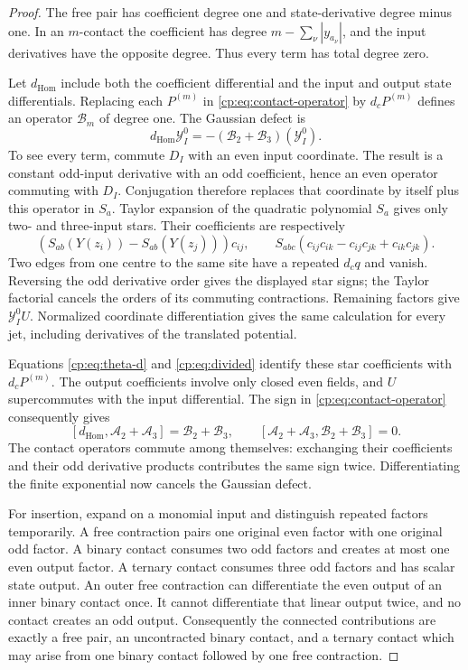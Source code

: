 \begin{proof}
The free pair has coefficient degree one and state-derivative degree
minus one.  In an \(m\)-contact the coefficient has degree
\(m-\sum_\nu|y_{a_\nu}|\), and the input derivatives have the
opposite degree.  Thus every term has total degree zero.

Let \(d_{\mathrm{Hom}}\) include both the coefficient differential
and the input and output state differentials.  Replacing each
\(P^{(m)}\) in \eqref{cp:eq:contact-operator} by \(d_cP^{(m)}\)
defines an operator \(\mathscr B_m\) of degree one.  The Gaussian
defect is
\[
 d_{\mathrm{Hom}}\mathcal Y_I^0
        =-(\mathscr B_2+\mathscr B_3)(\mathcal Y_I^0).
\]
To see every term, commute \(D_I\) with an even input coordinate.
The result is a constant odd-input derivative with an odd
coefficient, hence an even operator commuting with \(D_I\).
Conjugation therefore replaces that coordinate by itself plus this
operator in \(S_a\).  Taylor expansion of the quadratic polynomial
\(S_a\) gives only two- and three-input stars.  Their coefficients
are respectively
\[
 (S_{ab}(Y(z_i))-S_{ab}(Y(z_j)))c_{ij},
 \qquad
 S_{abc}(c_{ij}c_{ik}-c_{ij}c_{jk}+c_{ik}c_{jk}).
\]
Two edges from one centre to the same site have a repeated
\(d_cq\) and vanish.  Reversing the odd derivative order gives
the displayed star signs; the Taylor factorial cancels the orders
of its commuting contractions.  Remaining factors give
\(\mathcal Y_I^0U\).  Normalized coordinate differentiation gives
the same calculation for every jet, including derivatives of the
translated potential.

Equations \eqref{cp:eq:theta-d} and \eqref{cp:eq:divided} identify
these star coefficients with \(d_cP^{(m)}\).
The output coefficients involve only closed even fields, and \(U\)
supercommutes with the input differential.  The sign in
\eqref{cp:eq:contact-operator} consequently gives
\[
 [d_{\mathrm{Hom}},\mathscr A_2+\mathscr A_3]
       =\mathscr B_2+\mathscr B_3,
 \qquad
 [\mathscr A_2+\mathscr A_3,\mathscr B_2+\mathscr B_3]=0.
\]
The contact operators commute among themselves: exchanging their
coefficients and their odd derivative products contributes the same
sign twice.  Differentiating the finite exponential now cancels
the Gaussian defect.

For insertion, expand on a monomial input and distinguish repeated
factors temporarily.  A free contraction pairs one original even
factor with one original odd factor.  A binary contact consumes two
odd factors and creates at most one even output factor.  A ternary
contact consumes three odd factors and has scalar state output.
An outer free contraction can differentiate the even output of an
inner binary contact once.  It cannot differentiate that linear
output twice, and no contact creates an odd output.  Consequently
the connected contributions are exactly a free pair, an uncontracted
binary contact, and a ternary contact which may arise from one
binary contact followed by one free contraction.


\end{proof}

